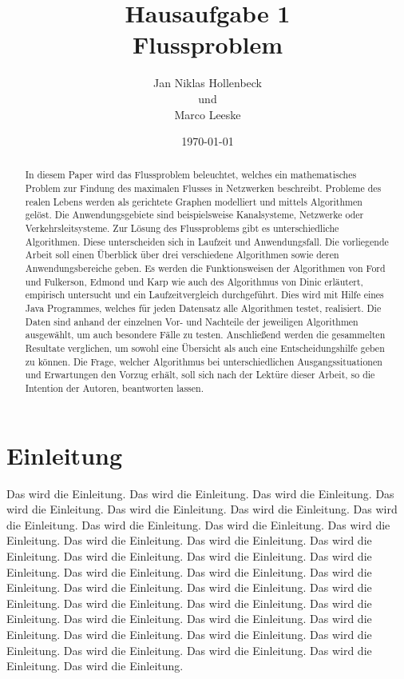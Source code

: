 \documentclass[11pt]{article}
\title{Hausaufgabe 1 \\ Flussproblem}
\author{Jan Niklas Hollenbeck \\ und \\ Marco Leeske}
\date{\today}
\begin{document}
\maketitle

\newpage

\begin{abstract}

In diesem Paper wird das Flussproblem beleuchtet, welches ein mathematisches Problem zur Findung des maximalen Flusses in Netzwerken beschreibt.
 Probleme des realen Lebens werden als gerichtete Graphen modelliert und mittels Algorithmen gelöst.
 Die Anwendungsgebiete sind beispielsweise Kanalsysteme, Netzwerke oder Verkehrsleitsysteme.
 Zur Lösung des Flussproblems gibt es unterschiedliche Algorithmen. Diese unterscheiden sich in Laufzeit und Anwendungsfall.
 Die vorliegende Arbeit soll einen Überblick über drei verschiedene Algorithmen sowie deren  Anwendungsbereiche geben.
 Es werden die Funktionsweisen der Algorithmen von Ford und Fulkerson, Edmond und Karp wie auch des Algorithmus von Dinic erläutert, empirisch untersucht und ein Laufzeitvergleich durchgeführt.
 Dies wird mit Hilfe eines Java Programmes, welches für jeden Datensatz alle Algorithmen testet, realisiert.
 Die Daten sind anhand der einzelnen Vor- und Nachteile der jeweiligen Algorithmen ausgewählt, um auch besondere  Fälle zu testen.
 Anschließend werden die gesammelten Resultate verglichen, um sowohl eine Übersicht als auch eine Entscheidungshilfe geben zu können.
 Die Frage, welcher Algorithmus bei unterschiedlichen Ausgangssituationen und Erwartungen den Vorzug erhält, soll sich nach der Lektüre dieser Arbeit, so die Intention der Autoren, beantworten lassen. 

\end{abstract}


\section{Einleitung}
\label{Einleitung}

Das wird die Einleitung. Das wird die Einleitung. Das wird die Einleitung. Das wird die Einleitung. Das wird die Einleitung. Das wird die Einleitung. Das wird die Einleitung. Das wird die Einleitung. Das wird die Einleitung. Das wird die Einleitung. Das wird die Einleitung. Das wird die Einleitung. Das wird die Einleitung. Das wird die Einleitung. Das wird die Einleitung. Das wird die Einleitung. Das wird die Einleitung. Das wird die Einleitung. Das wird die Einleitung. Das wird die Einleitung. Das wird die Einleitung. Das wird die Einleitung. Das wird die Einleitung. Das wird die Einleitung. Das wird die Einleitung. Das wird die Einleitung. Das wird die Einleitung. Das wird die Einleitung. Das wird die Einleitung. Das wird die Einleitung. Das wird die Einleitung. Das wird die Einleitung. Das wird die Einleitung. Das wird die Einleitung. Das wird die Einleitung. 
\end{document}
